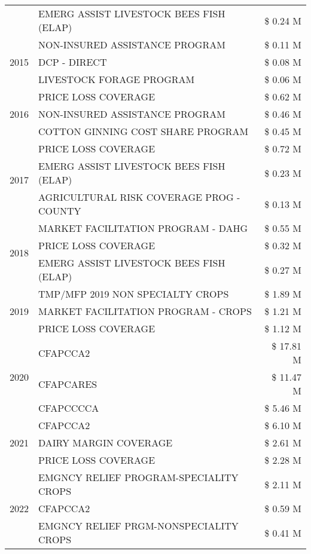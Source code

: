 \begin{tabular}{llr}
 & EMERG ASSIST LIVESTOCK BEES FISH (ELAP) & \$ 0.24 M \\
\cline{1-3}
\multirow[t]{3}{*}{2015} & NON-INSURED ASSISTANCE PROGRAM & \$ 0.11 M \\
 & DCP - DIRECT & \$ 0.08 M \\
 & LIVESTOCK FORAGE PROGRAM & \$ 0.06 M \\
\cline{1-3}
\multirow[t]{3}{*}{2016} & PRICE LOSS COVERAGE & \$ 0.62 M \\
 & NON-INSURED ASSISTANCE PROGRAM & \$ 0.46 M \\
 & COTTON GINNING COST SHARE PROGRAM & \$ 0.45 M \\
\cline{1-3}
\multirow[t]{3}{*}{2017} & PRICE LOSS COVERAGE & \$ 0.72 M \\
 & EMERG ASSIST LIVESTOCK BEES FISH (ELAP) & \$ 0.23 M \\
 & AGRICULTURAL RISK COVERAGE PROG - COUNTY & \$ 0.13 M \\
\cline{1-3}
\multirow[t]{3}{*}{2018} & MARKET FACILITATION PROGRAM - DAHG & \$ 0.55 M \\
 & PRICE LOSS COVERAGE & \$ 0.32 M \\
 & EMERG ASSIST LIVESTOCK BEES FISH (ELAP) & \$ 0.27 M \\
\cline{1-3}
\multirow[t]{3}{*}{2019} & TMP/MFP 2019 NON SPECIALTY CROPS & \$ 1.89 M \\
 & MARKET FACILITATION PROGRAM - CROPS & \$ 1.21 M \\
 & PRICE LOSS COVERAGE & \$ 1.12 M \\
\cline{1-3}
\multirow[t]{3}{*}{2020} & CFAPCCA2 & \$ 17.81 M \\
 & CFAPCARES & \$ 11.47 M \\
 & CFAPCCCCA & \$ 5.46 M \\
\cline{1-3}
\multirow[t]{3}{*}{2021} & CFAPCCA2 & \$ 6.10 M \\
 & DAIRY MARGIN COVERAGE & \$ 2.61 M \\
 & PRICE LOSS COVERAGE & \$ 2.28 M \\
\cline{1-3}
\multirow[t]{3}{*}{2022} & EMGNCY RELIEF PROGRAM-SPECIALITY CROPS & \$ 2.11 M \\
 & CFAPCCA2 & \$ 0.59 M \\
 & EMGNCY RELIEF PRGM-NONSPECIALITY CROPS & \$ 0.41 M \\
\cline{1-3}
\bottomrule
\end{tabular}
